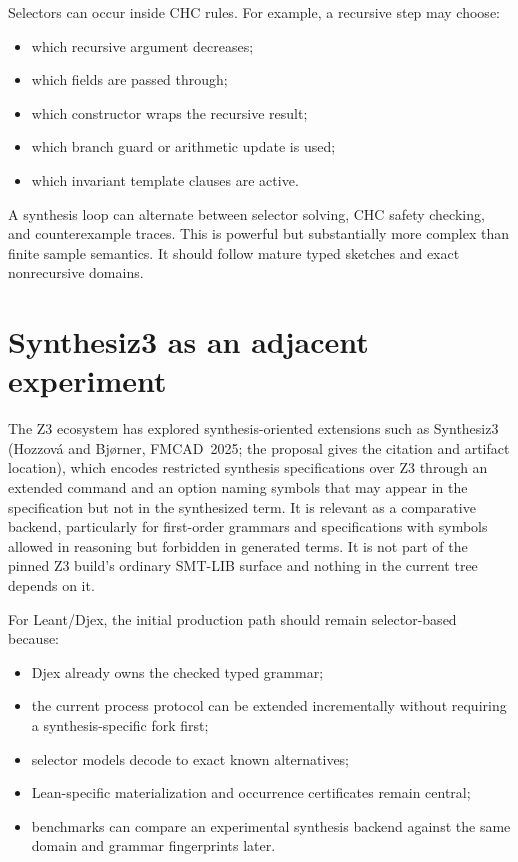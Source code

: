 \documentclass[10pt,letterpaper,oneside]{report}
\newcommand{\code}[1]{\texttt{\detokenize{#1}}}
\begin{document}
Selectors can occur inside CHC rules. For example, a recursive step may choose:

\begin{itemize}
\item which recursive argument decreases;
\item which fields are passed through;
\item which constructor wraps the recursive result;
\item which branch guard or arithmetic update is used;
\item which invariant template clauses are active.
\end{itemize}

A synthesis loop can alternate between selector solving, CHC safety checking, and counterexample traces. This is powerful but substantially more complex than finite sample semantics. It should follow mature typed sketches and exact nonrecursive domains.

\section{Synthesiz3 as an adjacent experiment}

The Z3 ecosystem has explored synthesis-oriented extensions such as Synthesiz3 (Hozzov\'a and Bj\o rner, FMCAD~2025; the proposal \cite{proposal} gives the citation and artifact location), which encodes restricted synthesis specifications over Z3 through an extended \code{assert-synth} command and an \code{:uncomputable} option naming symbols that may appear in the specification but not in the synthesized term. It is relevant as a comparative backend, particularly for first-order grammars and specifications with symbols allowed in reasoning but forbidden in generated terms. It is not part of the pinned Z3 build's ordinary SMT-LIB surface and nothing in the current tree depends on it.

For Leant/Djex, the initial production path should remain selector-based because:

\begin{itemize}
\item Djex already owns the checked typed grammar;
\item the current process protocol can be extended incrementally without requiring a synthesis-specific fork first;
\item selector models decode to exact known alternatives;
\item Lean-specific materialization and occurrence certificates remain central;
\item benchmarks can compare an experimental synthesis backend against the same domain and grammar fingerprints later.
\end{itemize}
\end{document}
